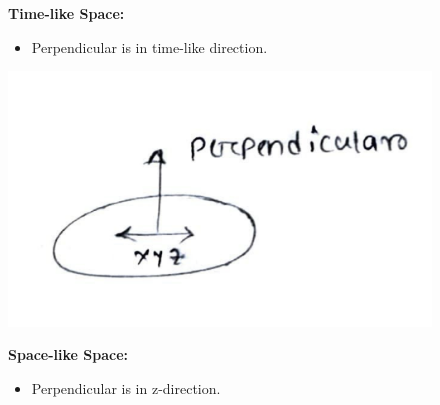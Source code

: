 \documentclass[14pt]{article} %
\begin{document}
\begin{tcolorbox}[ title=Post-class discussions]
\begin{figure}[H]
    \centering
    \vspace{-0.7cm}
    \begin{minipage}[t]{0.6\textwidth}
    \vspace{-2.5cm}
        \textbf{Time-like Space:}
        \begin{itemize}
            \item Perpendicular is in time-like direction.
        \end{itemize}
    \end{minipage}%
    \hfill
    \begin{minipage}[t]{0.35\textwidth}
        \includegraphics[width=\linewidth]{figures/L5_5.jpeg}
    \end{minipage}
    \begin{minipage}[t]{0.6\textwidth}
    \vspace{-3.5cm}
        \textbf{Space-like Space:}
        \begin{itemize}
            \item Perpendicular is in z-direction.
        \end{itemize}
    \end{minipage}%
    \hfill
    \begin{minipage}[t]{0.35\textwidth}

\end{minipage}
\end{figure}
\end{tcolorbox}
\end{document}
